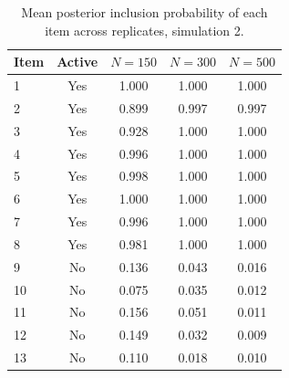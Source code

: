 \begin{table}[H]
\centering
\begin{tabular}{lcccc}
  \toprule
Item & Active & $N = 150$ & $N = 300$ & $N = 500$ \\ 
  \midrule
1 & Yes & 1.000 & 1.000 & 1.000 \\ 
  2 & Yes & 0.899 & 0.997 & 0.997 \\ 
  3 & Yes & 0.928 & 1.000 & 1.000 \\ 
  4 & Yes & 0.996 & 1.000 & 1.000 \\ 
  5 & Yes & 0.998 & 1.000 & 1.000 \\ 
  6 & Yes & 1.000 & 1.000 & 1.000 \\ 
  7 & Yes & 0.996 & 1.000 & 1.000 \\ 
  8 & Yes & 0.981 & 1.000 & 1.000 \\ 
  9 & No & 0.136 & 0.043 & 0.016 \\ 
  10 & No & 0.075 & 0.035 & 0.012 \\ 
  11 & No & 0.156 & 0.051 & 0.011 \\ 
  12 & No & 0.149 & 0.032 & 0.009 \\ 
  13 & No & 0.110 & 0.018 & 0.010 \\ 
   \bottomrule
\end{tabular}
\caption{Mean posterior inclusion probability of each item across replicates, simulation 2.} 
\label{table:sim2_item_pip}
\end{table}
